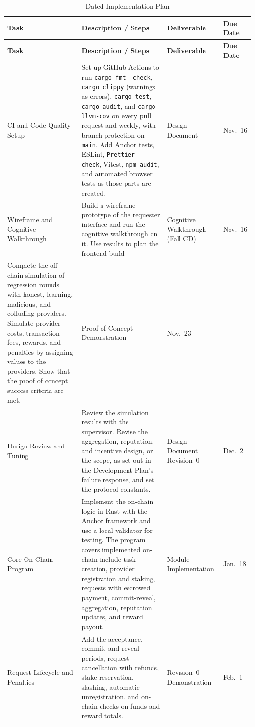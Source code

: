\documentclass[12pt]{article}
\begin{document}
\begin{longtable}{|p{}|p{}|p{}|p{}|}
\caption{Dated Implementation Plan} \label{tab:dated-implementation} \\
\hline
\textbf{Task} & \textbf{Description / Steps} & \textbf{Deliverable} & \textbf{Due Date} \\
\hline
\endfirsthead
\hline
\textbf{Task} & \textbf{Description / Steps} & \textbf{Deliverable} & \textbf{Due Date} \\
\hline
\endhead
CI and Code Quality Setup & Set up GitHub Actions to run \texttt{cargo fmt --check}, \texttt{cargo clippy} (warnings as errors), \texttt{cargo test}, \texttt{cargo audit}, and \texttt{cargo llvm-cov} on every pull request and weekly, with branch protection on \texttt{main}. Add Anchor tests, ESLint, \texttt{Prettier --check}, Vitest, \texttt{npm audit}, and automated browser tests as those parts are created. & Design Document & Nov.~16 \\
\hline
Wireframe and Cognitive Walkthrough & Build a wireframe prototype of the requester interface and run the cognitive walkthrough on it. Use results to plan the frontend build & Cognitive Walkthrough (Fall CD) & Nov.~16 \\
\hline
Complete the off-chain simulation of regression rounds with honest, learning, malicious, and colluding providers. Simulate provider costs, transaction fees, rewards, and penalties by assigning values to the providers. Show that the proof of concept success criteria are met. & Proof of Concept Demonstration & Nov.~23 \\
\hline
Design Review and Tuning & Review the simulation results with the supervisor. Revise the aggregation, reputation, and incentive design, or the scope, as set out in the Development Plan's failure response, and set the protocol constants. & Design Document Revision~0 & Dec.~2 \\
\hline
Core On-Chain Program & Implement the on-chain logic in Rust with the Anchor framework and use a local validator for testing. The program covers implemented on-chain include task creation, provider registration and staking, requests with escrowed payment, commit-reveal, aggregation, reputation updates, and reward payout. & Module Implementation & Jan.~18 \\
\hline
Request Lifecycle and Penalties & Add the acceptance, commit, and reveal periods, request cancellation with refunds, stake reservation, slashing, automatic unregistration, and on-chain checks on funds and reward totals. & Revision~0 Demonstration & Feb.~1 \\

\end{longtable}
\end{document}
